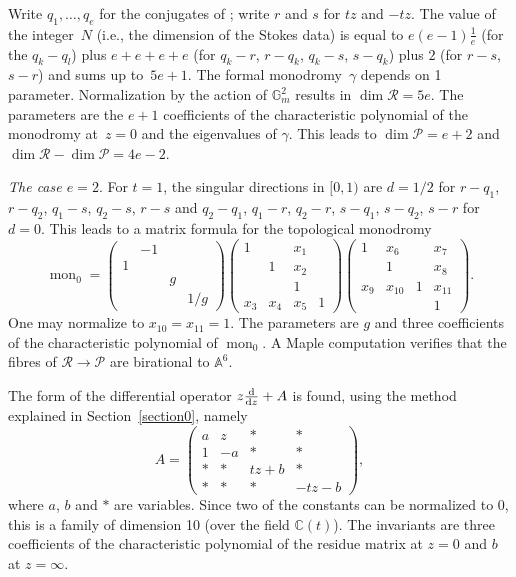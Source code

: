 \documentclass[pdftex]{sigma}
\numberwithin{equation}{section}
\begin{document}
Write $q_1,\dots , q_e$ for the conjugates of ; write $r$ and $s$ for $tz$ and $-tz$. The value of the integer~$N$ (i.e., the dimension of the Stokes data) is equal to $ e(e-1)\frac{1}{e}$ (for the $q_k-q_l$) plus $e+e+e+e$ (for $q_k-r$, $r-q_k$, $q_k-s$, $s-q_k$) plus $2$ (for $r-s$, $s-r$) and sums up to~${5e+1}$. The formal monodromy~$\gamma$ depends on 1 parameter. Normalization by the action of $\mathbb{G}_m^2$
results in $\dim \mathcal{R}=5e$. The parameters are the $e+1$ coefficients of the characteristic polynomial of the monodromy at~${z=0}$ and the eigenvalues of $\gamma$. This leads to $\dim \mathcal{P}=e+2$ and $\dim \mathcal{R}-\dim \mathcal{P}=4e-2$.

{\it The case $e=2$}. For $t=1$, the singular directions in $[0,1)$ are
$d=1/2$ for $r-q_1$, $r-q_2$, $q_1-s$, $q_2-s$, $r-s$ and $q_2-q_1$, $q_1-r$, $q_2-r$, $s-q_1$, $s-q_2$, $s-r$ for $d=0$. This leads to a matrix formula for the topological monodromy
\[\operatorname{mon}_0=\begin{pmatrix} & -1& & \\ 1& & & \\ & & g& \\ & & & 1/g\end{pmatrix}
\begin{pmatrix} 1 & & x_1& \\ & 1& x_2& \\ & & 1& \\ x_3&x_4 & x_5& 1\end{pmatrix}
\begin{pmatrix} 1&x_6 & & x_7\\ & 1& &x_8 \\ x_9&x_{10} & 1&x_{11} \\ & & & 1\end{pmatrix}. \]
One may normalize to $x_{10}=x_{11}=1$. The parameters are $g$ and three coefficients of the characteristic polynomial of $\operatorname{mon}_0$.
A Maple computation verifies that the fibres of $\mathcal{R}\rightarrow \mathcal{P}$ are
 birational to $\mathbb{A}^6$.

The form of the differential operator $z\frac{{\rm d}}{{\rm d}z}+A$ is found, using the method explained in
Section~\ref{section0}, namely
\[ A= \begin{pmatrix} a&z & *&* \\ 1&-a & *&* \\ *&* &tz+b &* \\ *&* &* &-tz-b \end{pmatrix},\]
 where $a$, $b$ and $*$ are variables. Since two of the constants can be normalized to $0$, this is a family of dimension 10
 (over the field $\mathbb{C}(t)$).
 The invariants are three coefficients of the characteristic polynomial of the residue matrix at $z=0$ and $b$
 at $z=\infty$.
\end{document}

